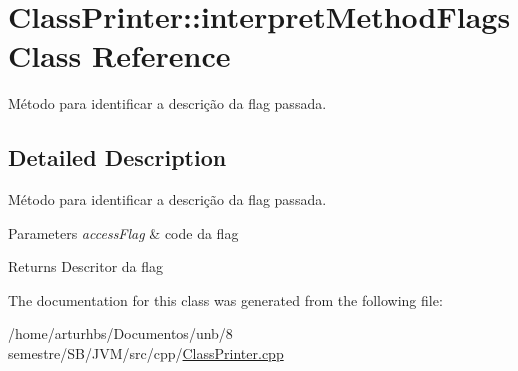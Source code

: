 \hypertarget{classClassPrinter_1_1interpretMethodFlags}{}\section{Class\+Printer\+:\+:interpret\+Method\+Flags Class Reference}
\label{classClassPrinter_1_1interpretMethodFlags}


Método para identificar a descrição da flag passada.  




\subsection{Detailed Description}
Método para identificar a descrição da flag passada. 


\begin{DoxyParams}{Parameters}
{\em access\+Flag} & code da flag \\
\hline
\end{DoxyParams}
\begin{DoxyReturn}{Returns}
Descritor da flag 
\end{DoxyReturn}


The documentation for this class was generated from the following file\+:\begin{DoxyCompactItemize}
\item 
/home/arturhbs/\+Documentos/unb/8 semestre/\+S\+B/\+J\+V\+M/src/cpp/\hyperlink{ClassPrinter_8cpp}{Class\+Printer.\+cpp}\end{DoxyCompactItemize}
